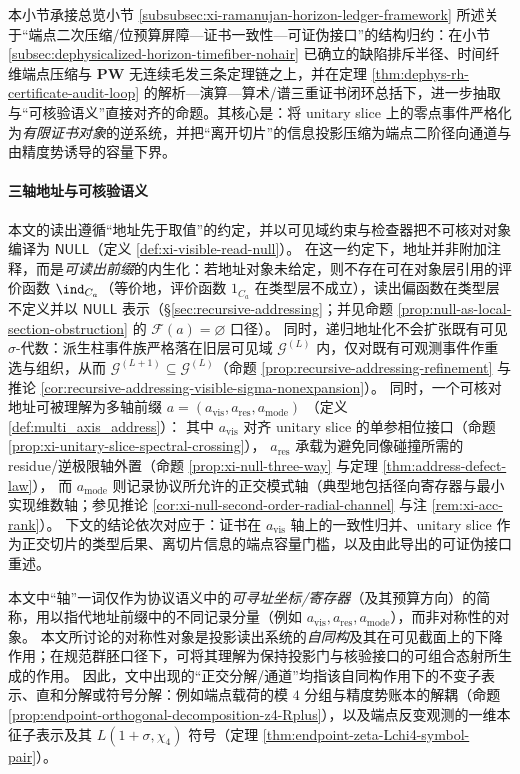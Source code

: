 \label{subsec:xi-certificate-coherence-orthogonal-axis-capacity-part1}

本小节承接总览小节 \ref{subsubsec:xi-ramanujan-horizon-ledger-framework} 所述关于“端点二次压缩/位预算屏障—证书一致性—可证伪接口”的结构归约：在小节 \ref{subsec:dephysicalized-horizon-timefiber-nohair} 已确立的缺陷排斥半径、时间纤维端点压缩与 \(\mathbf{PW}\) 无连续毛发三条定理链之上，并在定理 \ref{thm:dephys-rh-certificate-audit-loop} 的解析—演算—算术/谱三重证书闭环总括下，进一步抽取与“可核验语义”直接对齐的命题。其核心是：将 unitary slice 上的零点事件严格化为\emph{有限证书对象}的逆系统，并把“离开切片”的信息投影压缩为端点二阶径向通道与由精度势诱导的容量下界。

\paragraph{三轴地址与可核验语义}
本文的读出遵循“地址先于取值”的约定，并以可见域约束与检查器把不可核对对象编译为 \(\mathsf{NULL}\)（定义 \ref{def:xi-visible-read-null}）。
在这一约定下，地址并非附加注释，而是\emph{可读出前缀}的内生化：若地址对象未给定，则不存在可在对象层引用的评价函数 \(\ind_{C_a}\)（等价地，评价函数 \(1_{C_a}\) 在类型层不成立），读出偏函数在类型层不定义并以 \(\mathsf{NULL}\) 表示（\S\ref{sec:recursive-addressing}；并见命题 \ref{prop:null-as-local-section-obstruction} 的 \(\mathscr{F}(a)=\varnothing\) 口径）。
同时，递归地址化不会扩张既有可见 \(\sigma\)-代数：派生柱事件族严格落在旧层可见域 \(\mathcal{G}^{(L)}\) 内，仅对既有可观测事件作重选与组织，从而 \(\mathcal{G}^{(L+1)}\subseteq \mathcal{G}^{(L)}\)（命题 \ref{prop:recursive-addressing-refinement} 与推论 \ref{cor:recursive-addressing-visible-sigma-nonexpansion}）。
同时，一个可核对地址可被理解为多轴前缀
\(
a=(a_{\mathrm{vis}},a_{\mathrm{res}},a_{\mathrm{mode}})
\)
（定义 \ref{def:multi_axis_address}）：
其中 \(a_{\mathrm{vis}}\) 对齐 unitary slice 的单参相位接口（命题 \ref{prop:xi-unitary-slice-spectral-crossing}），
\(a_{\mathrm{res}}\) 承载为避免同像碰撞所需的 residue/逆极限轴外置（命题 \ref{prop:xi-null-three-way} 与定理 \ref{thm:address-defect-law}），
而 \(a_{\mathrm{mode}}\) 则记录协议所允许的正交模式轴（典型地包括径向寄存器与最小实现维数轴；参见推论 \ref{cor:xi-null-second-order-radial-channel} 与注 \ref{rem:xi-acc-rank}）。
下文的结论依次对应于：证书在 \(a_{\mathrm{vis}}\) 轴上的一致性归并、unitary slice 作为正交切片的类型后果、离切片信息的端点容量门槛，以及由此导出的可证伪接口重述。

\begin{remark}\label{rem:axis-vs-automorphism-terminology}
本文中“轴”一词仅作为协议语义中的\emph{可寻址坐标/寄存器}（及其预算方向）的简称，用以指代地址前缀中的不同记录分量（例如 \(a_{\mathrm{vis}},a_{\mathrm{res}},a_{\mathrm{mode}}\)），而非对称性的对象。
本文所讨论的对称性对象是投影读出系统的\emph{自同构}及其在可见截面上的下降作用；在规范群胚口径下，可将其理解为保持投影门与核验接口的可组合态射所生成的作用。
因此，文中出现的“正交分解/通道”均指该自同构作用下的不变子表示、直和分解或符号分解：例如端点载荷的模 \(4\) 分组与精度势账本的解耦（命题 \ref{prop:endpoint-orthogonal-decomposition-z4-Rplus}），以及端点反变观测的一维本征子表示及其 \(L(1+\sigma,\chi_4)\) 符号（定理 \ref{thm:endpoint-zeta-Lchi4-symbol-pair}）。
\end{remark}

